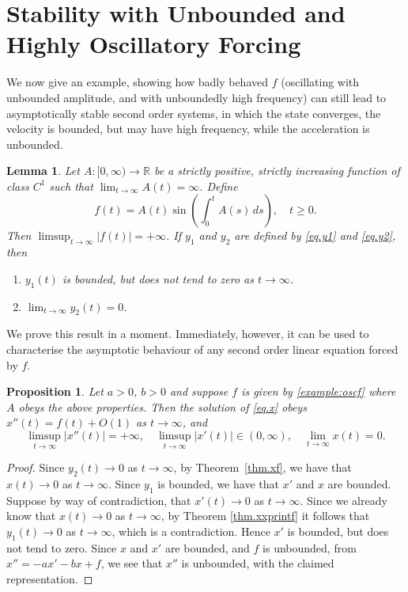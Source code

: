 \documentclass[10pt,reqno]{amsart}
\newtheorem{lemma}[theorem]{Lemma}
\newtheorem{proposition}[theorem]{Proposition}
\theoremstyle{definition}
\begin{document}
\section{Stability with Unbounded and Highly Oscillatory Forcing}
We now give an example, showing how badly behaved $f$ (oscillating with unbounded amplitude, and with unboundedly high frequency)
can still lead to asymptotically stable second order systems, in which the state converges, the velocity is bounded, but may have high frequency, while the acceleration is unbounded. 
\begin{lemma} \label{lemma.osc}			Let $A: [0, \infty) \to \mathbb{R}$ be a strictly positive, strictly increasing function of class $C^1$ such that $\lim_{t \to \infty} A(t) = \infty$. 
	Define 
	\begin{equation}  \label{example:oscf}
		f(t) = A(t)\sin\left(\int_0^t A(s) \, ds\right), \quad t\geq 0.
	\end{equation} 
	Then $\limsup_{t\to\infty} |f(t)|=+\infty$. If $y_1$ and $y_2$ are defined by \eqref{eq.y1} and \eqref{eq.y2}, then 
	\begin{enumerate}
		\item[(i)] $y_1(t)$ is bounded, but does not tend to zero as $t \to \infty$.
		\item[(ii)] $\lim_{t \to \infty} y_2(t) = 0$.
	\end{enumerate}
\end{lemma}
We prove this result in a moment. Immediately, however, it can be used to characterise the asymptotic behaviour of any second order linear equation forced by $f$. 
\begin{proposition}
	Let $a>0$, $b>0$ and suppose $f$ is given by \eqref{example:oscf} where $A$ obeys the above properties. Then the solution of \eqref{eq.x} obeys $x''(t)=f(t)+O(1)$ as $ t\to\infty$, and 
	\[
	\limsup_{t\to\infty}|x''(t)|=+\infty, \quad \limsup_{t\to\infty}|x'(t)|\in (0,\infty), \quad \lim_{t\to\infty}x(t)=0. 
	\]
\end{proposition}
\begin{proof}
	Since $y_2(t)\to 0$ as $t\to\infty$, by Theorem~\ref{thm.xf}, we have that $x(t)\to 0$ as $t\to\infty$. Since $y_1$ is bounded, we have that $x'$ and $x$ are bounded. Suppose by way of contradiction, that $x'(t)\to 0$ as $t\to\infty$. Since we already know that $x(t)\to 0$ as $t\to\infty$, by Theorem \ref{thm.xxprintf} it follows that $y_1(t)\to 0$ as $t\to\infty$, which is a contradiction. Hence $x'$ is bounded, but does not tend to zero. Since $x$ and $x'$ are bounded, and $f$ is unbounded, from $x''=-ax'-bx+f$, we see that $x''$ is unbounded, with the claimed representation.
\end{proof} 
\end{document}
